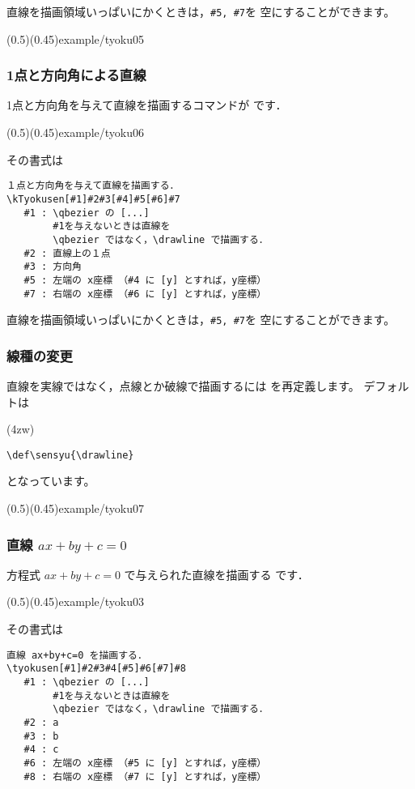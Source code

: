 直線を描画領域いっぱいにかくときは，\verb/#5, #7/を
空にすることができます。

\showexample[端点の指定省略](0.5)(0.45){example/tyoku05}

\subsubsection{1点と方向角による直線}
1点と方向角を与えて直線を描画するコマンドが
 です．

\showexample[1点と方向角を指定](0.5)(0.45){example/tyoku06}

その書式は
\begin{boxnote}
\begin{verbatim}
１点と方向角を与えて直線を描画する．
\kTyokusen[#1]#2#3[#4]#5[#6]#7
   #1 : \qbezier の [...]
        #1を与えないときは直線を
        \qbezier ではなく，\drawline で描画する．
   #2 : 直線上の１点
   #3 : 方向角
   #5 : 左端の x座標 （#4 に [y] とすれば，y座標）
   #7 : 右端の x座標 （#6 に [y] とすれば，y座標）
\end{verbatim}
\end{boxnote}

直線を描画領域いっぱいにかくときは，\verb/#5, #7/を
空にすることができます。

\subsubsection{線種の変更}
直線を実線ではなく，点線とか破線で描画するには を再定義します。
デフォルトは
\begin{jquote}(4zw)
\begin{verbatim}
\def\sensyu{\drawline}
\end{verbatim}
\end{jquote}
となっています。

\showexample[線種の変更](0.5)(0.45){example/tyoku07}

\subsubsection{直線 \texorpdfstring{%
      \protect $ax+by+c=0$}{ax+by+c=0}}
方程式 $ax+by+c=0$ で与えられた直線を描画する  です．

\showexample[方程式の係数指定](0.5)(0.45){example/tyoku03}

その書式は
\begin{boxnote}
\begin{verbatim}
直線 ax+by+c=0 を描画する．
\tyokusen[#1]#2#3#4[#5]#6[#7]#8
   #1 : \qbezier の [...]
        #1を与えないときは直線を
        \qbezier ではなく，\drawline で描画する．
   #2 : a
   #3 : b
   #4 : c
   #6 : 左端の x座標 （#5 に [y] とすれば，y座標）
   #8 : 右端の x座標 （#7 に [y] とすれば，y座標）
\end{verbatim}
\end{boxnote}

